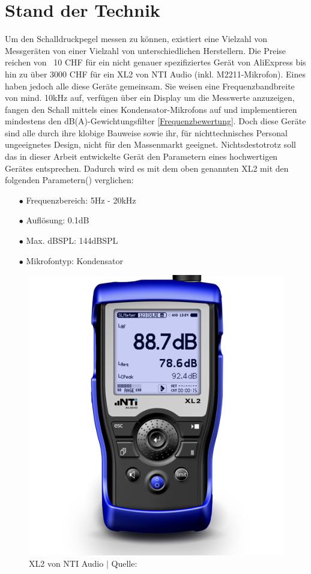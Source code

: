 \documentclass[12pt]{article}
\begin{document}
	\section{Stand der Technik}\label{Stand}
	Um den Schalldruckpegel messen zu können, existiert eine Vielzahl von Messgeräten von einer Vielzahl von unterschiedlichen Herstellern. Die Preise reichen von ~10 CHF für ein nicht genauer spezifiziertes Gerät von AliExpress bis hin zu über 3000 CHF für ein XL2 von NTI Audio (inkl. M2211-Mikrofon). Eines haben jedoch alle diese Geräte gemeinsam. Sie weisen eine Frequenzbandbreite von mind. 10kHz auf, verfügen über ein Display um die Messwerte anzuzeigen, fangen den Schall mittels eines Kondensator-Mikrofons auf und implementieren mindestens den dB(A)-Gewichtungsfilter \ref{Frequenzbewertung}. Doch diese Geräte sind alle durch ihre klobige Bauweise sowie ihr, für nichttechnisches Personal ungeeignetes Design, nicht für den Massenmarkt geeignet. Nichtsdestotrotz soll das in dieser Arbeit entwickelte Gerät den Parametern eines hochwertigen Gerätes entsprechen. Dadurch wird es mit dem oben genannten XL2 mit den folgenden Parametern(\cite{noauthor_xl2_nodate}) verglichen:
	\begin{itemize}[topsep=10pt,partopsep=0pt,labelwidth=5cm,align=left,itemindent=5cm]
		\item[$\bullet$ Frequenzbereich:]  5Hz - 20kHz
		\item[$\bullet$ Auflösung:]  0.1dB
		\item[$\bullet$ Max. dBSPL:]  144dBSPL
		\item[$\bullet$ Mikrofontyp:]  Kondensator
	\end{itemize}
	\begin{figure}[H]
		\centering
		\includegraphics[width=0.4\linewidth]{images/BAT_NTi-Audio-XL2-500}
		\caption{XL2 von NTI Audio $\vert$ Quelle: \cite{noauthor_xl2_nodate}}
		\label{fig:batnti-audio-xl2-500}
	\end{figure}
		
\end{document}
